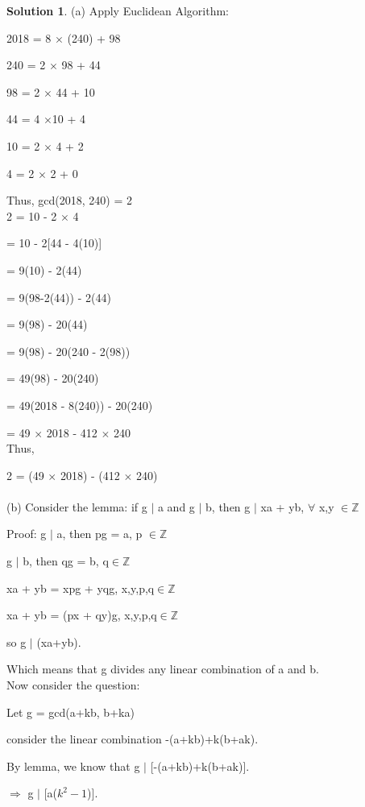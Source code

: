 \documentclass{article}
\theoremstyle{definition}
\newtheorem*{solution}{Solution}
\begin{document}
\begin{solution}
(a) Apply Euclidean Algorithm:

2018 = 8 \(\times\) (240) + 98

240 = 2 \(\times\) 98 + 44

98 = 2 \(\times\) 44 + 10

44 = 4 \(\times \)10 + 4

10 = 2 \(\times\) 4 + 2

4 = 2 \(\times\) 2 + 0

Thus, gcd(2018, 240) = 2\\

2 = 10 - 2 \(\times\) 4

= 10 - 2[44 - 4(10)]

= 9(10) - 2(44)

= 9(98-2(44)) - 2(44)

= 9(98) - 20(44)

= 9(98) - 20(240 - 2(98))

= 49(98) - 20(240)

= 49(2018 - 8(240)) - 20(240)

= 49 \(\times\) 2018 - 412 \(\times\) 240\\

Thus, 

2 = (49 \(\times\) 2018) - (412 \(\times\) 240)\\\\




(b)
Consider the lemma: if g \(|\) a and g \(|\) b, then g \(|\) xa + yb, \(\forall\) x,y \(\in\)\(\mathbb{Z}\)

Proof: g \(|\) a, then pg = a, p \(\in\)\(\mathbb{Z}\)

g \(|\) b, then qg = b, q\(\in\)\(\mathbb{Z}\)

xa + yb = xpg + yqg, x,y,p,q\(\in\)\(\mathbb{Z}\)

xa + yb = (px + qy)g, x,y,p,q\(\in\)\(\mathbb{Z}\)

so g \(|\) (xa+yb).

Which means that g divides any linear combination of a and b.\\

Now consider the question:

Let g = gcd(a+kb, b+ka)

consider the linear combination -(a+kb)+k(b+ak).

By lemma, we know that g \(|\) [-(a+kb)+k(b+ak)].

\(\Rightarrow\) g \(|\) [a(\(k^2-1\))].\\



\end{solution}
\end{document}
